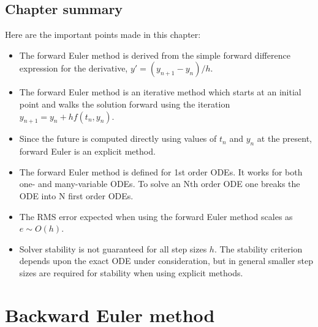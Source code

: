 \documentclass[hidelinks,notitlepage]{book}
\begin{document}
\section{Chapter summary}
Here are the important points made in this chapter:
\begin{itemize}
\item The forward Euler method is derived from the simple forward difference expression for the derivative, $y' = (y_{n+1} - y_n)/h$.
\item The forward Euler method is an iterative method which starts at an initial point and walks the solution forward using the iteration $y_{n+1} = y_n + h f(t_n, y_n)$.
\item Since the future is computed directly using values of $t_n$ and $y_n$ at the present, forward Euler is an explicit method.
\item The forward Euler method is defined for 1st order ODEs.  It works for both one- and many-variable ODEs.  To solve an Nth order ODE one breaks the ODE into N first order ODEs.
\item The RMS error expected when using the forward Euler method scales as $e \sim O(h)$.
\item Solver stability is not guaranteed for all step sizes $h$.  The stability criterion depends upon the exact ODE under consideration, but in general smaller step sizes are required for stability when using explicit methods.
\end{itemize}

\chapter{Backward Euler method}
\end{document}
